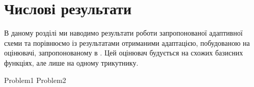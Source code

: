 
\section{Числові результати}

В даному розділі ми наводимо результати роботи запропонованої адаптивної схеми та порівнюємо
	із результатами отриманими адаптацією, побудованою на оцінювачі, запропонованому в \cite{OstShynAee11}. Цей оцінювач будується на схожих базисних функціях, але лише на одному трикутнику.

{Problem1}
{Problem2}

